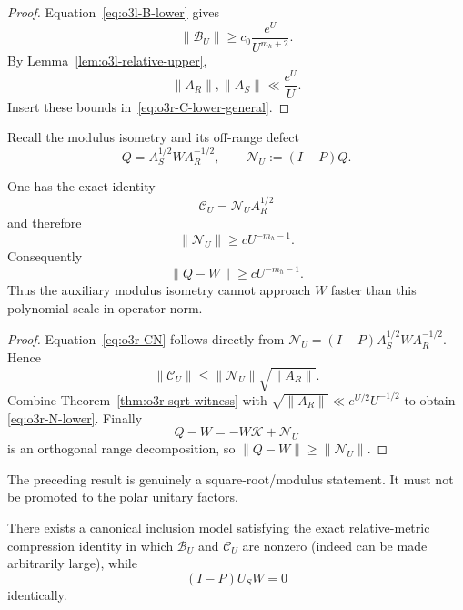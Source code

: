 \begin{proof}
Equation~\eqref{eq:o3l-B-lower} gives
\[
 \|\mathscr B_U\|\ge c_0\frac{e^U}{U^{m_h+2}}.
\]
By Lemma~\ref{lem:o3l-relative-upper},
\[
 \|A_R\|,\|A_S\|\ll\frac{e^U}{U}.
\]
Insert these bounds in~\eqref{eq:o3r-C-lower-general}.
\end{proof}

Recall the modulus isometry and its off-range defect
\[
 Q=A_S^{1/2}WA_R^{-1/2},
 \qquad
 \mathscr N_U:=(I-P)Q.
\]

\begin{corollary}
\label{cor:o3r-modulus-leakage}
One has the exact identity
\[
 \boxed{\mathscr C_U=\mathscr N_UA_R^{1/2}}
\tag{O3R.5}\label{eq:o3r-CN}
\]
and therefore
\[
 \boxed{
 \|\mathscr N_U\|\ge cU^{-m_h-1}.
 }
\tag{O3R.6}\label{eq:o3r-N-lower}
\]
Consequently
\[
 \boxed{
 \|Q-W\|\ge cU^{-m_h-1}.
 }
\tag{O3R.7}\label{eq:o3r-QW-lower}
\]
Thus the auxiliary modulus isometry cannot approach $W$ faster than this polynomial
scale in operator norm.
\end{corollary}

\begin{proof}
Equation~\eqref{eq:o3r-CN} follows directly from
$\mathscr N_U=(I-P)A_S^{1/2}WA_R^{-1/2}$.  Hence
\[
 \|\mathscr C_U\|
 \le\|\mathscr N_U\|\sqrt{\|A_R\|}.
\]
Combine Theorem~\ref{thm:o3r-sqrt-witness} with
$\sqrt{\|A_R\|}\ll e^{U/2}U^{-1/2}$ to obtain
\eqref{eq:o3r-N-lower}.  Finally
\[
 Q-W=-W\mathscr K+\mathscr N_U
\]
is an orthogonal range decomposition, so
$\|Q-W\|\ge\|\mathscr N_U\|$.
\end{proof}

The preceding result is genuinely a square-root/modulus statement.  It must not be
promoted to the polar unitary factors.

\begin{proposition}
\label{prop:o3r-polar-countermodel}
There exists a canonical inclusion model satisfying the exact relative-metric
compression identity in which $\mathscr B_U$ and $\mathscr C_U$ are nonzero (indeed can
be made arbitrarily large), while
\[
 \boxed{(I-P)U_SW=0}
\tag{O3R.8}\label{eq:o3r-polar-zero}
\]
identically.
\end{proposition}

